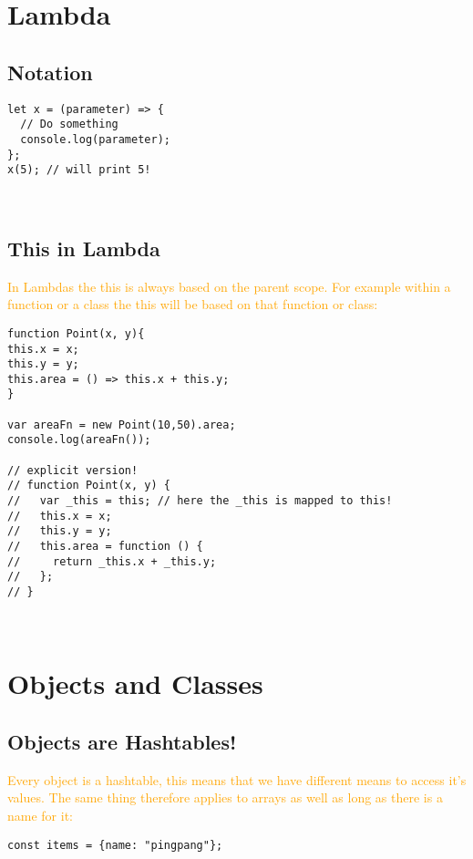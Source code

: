 \documentclass[main.tex,fontsize=6pt,paper=a4,paper=landscape,DIV=calc,]{scrartcl}
\begin{document}
\begin{multicols*}{4}
\section{Lambda}

\subsection{Notation}  
\begin{lstlisting}
let x = (parameter) => {
  // Do something
  console.log(parameter);
};
x(5); // will print 5!
\end{lstlisting}
\, \newline

\subsection{This in Lambda} 
\textcolor{orange}{In Lambdas the this is always based on the parent scope.\newline
For example within a function or a class the this will be based on that function or class:}\newline
\begin{lstlisting}
function Point(x, y){
this.x = x;
this.y = y;
this.area = () => this.x + this.y;
}

var areaFn = new Point(10,50).area;
console.log(areaFn());

// explicit version!
// function Point(x, y) {
//   var _this = this; // here the _this is mapped to this!
//   this.x = x;
//   this.y = y;
//   this.area = function () {
//     return _this.x + _this.y;
//   };
// }
\end{lstlisting}
\, \newline


\section{Objects and Classes}

\subsection{Objects are Hashtables!} 
\textcolor{orange}{Every object is a hashtable, this means that we have different means to access it's values. \newline
The same thing therefore applies to arrays as well as long as there is a name for it:}\newline
\begin{lstlisting}
const items = {name: "pingpang"};


\end{lstlisting}
\end{multicols*}
\end{document}
